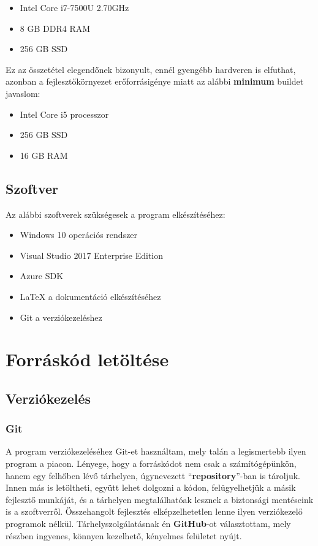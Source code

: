 \documentclass[a4paper,12pt]{report}
\begin{document}
    \begin{itemize}
        \item Intel Core i7-7500U 2.70GHz
        \item 8 GB DDR4 RAM
        \item 256 GB SSD
    \end{itemize}

    Ez az összetétel elegendőnek bizonyult, ennél gyengébb hardveren is elfuthat, azonban a fejlesztőkörnyezet erőforrásigénye
    miatt az alábbi \textbf{minimum} buildet javaslom:

    \begin{itemize}
        \item Intel Core i5 processzor
        \item 256 GB SSD
        \item 16 GB RAM
    \end{itemize}

    \subsection{Szoftver}
    Az alábbi szoftverek szükségesek a program elkészítéséhez:

    \begin{itemize}
        \item Windows 10 operációs rendszer
        \item Visual Studio 2017 Enterprise Edition
        \item Azure SDK
        \item LaTeX a dokumentáció elkészítéséhez
        \item Git a verziókezeléshez
    \end{itemize}

    \section{Forráskód letöltése}

    \subsection{Verziókezelés}

    \subsubsection{Git}
    A program verziókezeléséhez Git-et használtam, mely talán a legismertebb ilyen program a piacon. Lényege, hogy a forráskódot
    nem csak a számítógépünkön, hanem egy felhőben lévő tárhelyen, úgynevezett ``\textbf{repository}''-ban is tároljuk. Innen
    más is letöltheti, együtt lehet dolgozni a kódon, felügyelhetjük a másik fejlesztő munkáját, és a tárhelyen megtalálhatóak lesznek a
    biztonsági mentéseink is a szoftverről. Összehangolt fejlesztés elképzelhetetlen lenne ilyen verziókezelő programok nélkül.
    Tárhelyszolgálatásnak én \textbf{GitHub}-ot választottam, mely részben ingyenes, könnyen kezelhető, kényelmes felületet nyújt.
\end{document}
